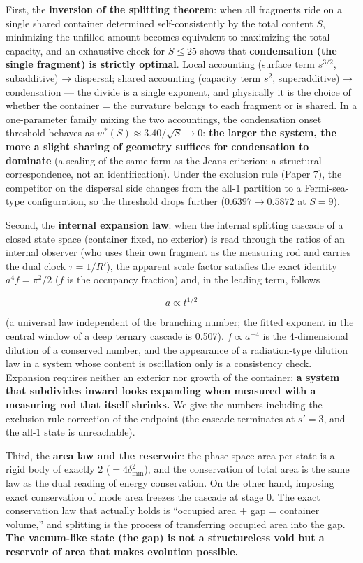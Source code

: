 \documentclass[
]{ltjsarticle}
\begin{document}
First, the \textbf{inversion of the splitting theorem}: when all
fragments ride on a single shared container determined self-consistently
by the total content \(S\), minimizing the unfilled amount becomes
equivalent to maximizing the total capacity, and an exhaustive check for
\(S\le25\) shows that \textbf{condensation (the single fragment) is
strictly optimal}. Local accounting (surface term \(s^{3/2}\),
subadditive) → dispersal; shared accounting (capacity term \(s^2\),
superadditive) → condensation --- the divide is a single exponent, and
physically it is the choice of whether the container = the curvature
belongs to each fragment or is shared. In a one-parameter family mixing
the two accountings, the condensation onset threshold behaves as
\(w^*(S)\approx 3.40/\sqrt S\to0\): \textbf{the larger the system, the
more a slight sharing of geometry suffices for condensation to dominate}
(a scaling of the same form as the Jeans criterion; a structural
correspondence, not an identification). Under the exclusion rule (Paper
7), the competitor on the dispersal side changes from the all-1
partition to a Fermi-sea-type configuration, so the threshold drops
further (\(0.6397\to0.5872\) at \(S=9\)).

Second, the \textbf{internal expansion law}: when the internal splitting
cascade of a closed state space (container fixed, no exterior) is read
through the ratios of an internal observer (who uses their own fragment
as the measuring rod and carries the dual clock \(\tau=1/R'\)), the
apparent scale factor satisfies the exact identity \(a^4 f=\pi^2/2\)
(\(f\) is the occupancy fraction) and, in the leading term, follows

\[
a\propto t^{1/2}
\]

(a universal law independent of the branching number; the fitted
exponent in the central window of a deep ternary cascade is 0.507).
\(f\propto a^{-4}\) is the 4-dimensional dilution of a conserved number,
and the appearance of a radiation-type dilution law in a system whose
content is oscillation only is a consistency check. Expansion requires
neither an exterior nor growth of the container: \textbf{a system that
subdivides inward looks expanding when measured with a measuring rod
that itself shrinks.} We give the numbers including the exclusion-rule
correction of the endpoint (the cascade terminates at \(s'=3\), and the
all-1 state is unreachable).

Third, the \textbf{area law and the reservoir}: the phase-space area per
state is a rigid body of exactly 2 (\(=4\delta_{\min}^2\)), and the
conservation of total area is the same law as the dual reading of energy
conservation. On the other hand, imposing exact conservation of mode
area freezes the cascade at stage 0. The exact conservation law that
actually holds is ``occupied area + gap = container volume,'' and
splitting is the process of transferring occupied area into the gap.
\textbf{The vacuum-like state (the gap) is not a structureless void but
a reservoir of area that makes evolution possible.}
\end{document}

